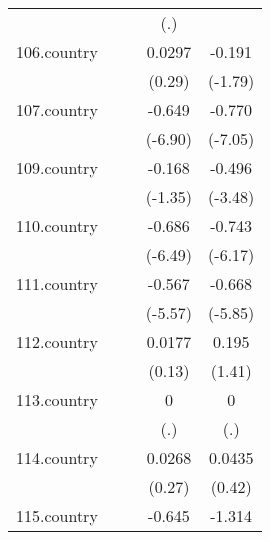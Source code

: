 {\begin{tabular}{l*{4}{c}}
            &                     &                     &         (.)         &                     \\
[1em]
106.country &                     &                     &      0.0297         &      -0.191         \\
            &                     &                     &      (0.29)         &     (-1.79)         \\
[1em]
107.country &                     &                     &      -0.649\sym{***}&      -0.770\sym{***}\\
            &                     &                     &     (-6.90)         &     (-7.05)         \\
[1em]
109.country &                     &                     &      -0.168         &      -0.496\sym{***}\\
            &                     &                     &     (-1.35)         &     (-3.48)         \\
[1em]
110.country &                     &                     &      -0.686\sym{***}&      -0.743\sym{***}\\
            &                     &                     &     (-6.49)         &     (-6.17)         \\
[1em]
111.country &                     &                     &      -0.567\sym{***}&      -0.668\sym{***}\\
            &                     &                     &     (-5.57)         &     (-5.85)         \\
[1em]
112.country &                     &                     &      0.0177         &       0.195         \\
            &                     &                     &      (0.13)         &      (1.41)         \\
[1em]
113.country &                     &                     &           0         &           0         \\
            &                     &                     &         (.)         &         (.)         \\
[1em]
114.country &                     &                     &      0.0268         &      0.0435         \\
            &                     &                     &      (0.27)         &      (0.42)         \\
[1em]
115.country &                     &                     &      -0.645\sym{***}&      -1.314\sym{***}\\

\end{tabular}}
